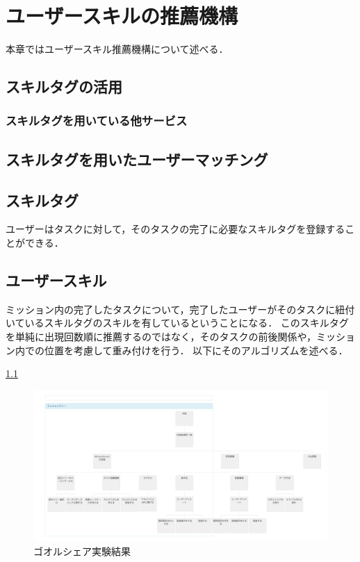 \chapter{ユーザースキルの推薦機構}
本章ではユーザースキル推薦機構について述べる．

\section{スキルタグの活用}

\subsection{スキルタグを用いている他サービス}


\section{スキルタグを用いたユーザーマッチング}





\section{スキルタグ}
ユーザーはタスクに対して，そのタスクの完了に必要なスキルタグを登録することができる．

\section{ユーザースキル}
ミッション内の完了したタスクについて，完了したユーザーがそのタスクに紐付いているスキルタグのスキルを有しているということになる．
このスキルタグを単純に出現回数順に推薦するのではなく，そのタスクの前後関係や，ミッション内での位置を考慮して重み付けを行う．
以下にそのアルゴリズムを述べる．


\ref{img:large_mission}

\begin{figure}[t]
	\begin{center}
		\includegraphics[width=0.9\linewidth]{assets/img/large_mission.png}
		\caption{ゴオルシェア実験結果}
		\label{img:large_mission}
	\end{center}
\end{figure}

